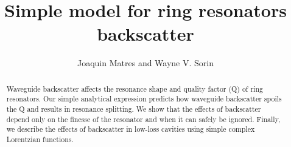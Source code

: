 \documentclass[10pt]{article}
\begin{document}
\title{Simple model for ring resonators backscatter}
\author{Joaquin Matres and Wayne V. Sorin}  
\address{Hewlett Packard Labs, 1501 Page Mill Road, Palo Alto, CA 94304} 


\begin{abstract}
Waveguide backscatter affects the resonance shape and quality factor (Q) of ring resonators.
Our simple analytical expression predicts how waveguide backscatter spoils the Q and results in resonance splitting.
We show that the effects of backscatter depend only on the finesse of the resonator and when it can safely be ignored.
Finally, we describe the effects of backscatter in low-loss cavities using simple complex Lorentzian functions.
\end{abstract}

\end{document}
